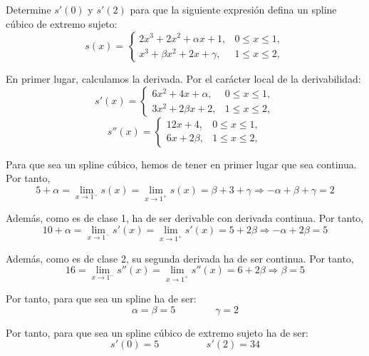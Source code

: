 \documentclass[12pt]{article}
\begin{document}
    \begin{ejercicio} 
    Determine $s'(0)$ y $s'(2)$ para que la siguiente expresión defina un spline cúbico de extremo sujeto:
    \begin{equation*}
        s(x)=\left\{\begin{array}{cc}
             2x^3 + 2x^2 +\alpha x +1, & 0\leq x \leq 1,  \\
             x^3+\beta x^2 + 2x + \gamma, & 1\leq x \leq 2,
        \end{array}\right.
    \end{equation*}

    En primer lugar, calculamos la derivada. Por el carácter local de la derivabilidad:
    \begin{equation*}
        s'(x)=\left\{\begin{array}{cc}
             6x^2 + 4x + \alpha , & 0\leq x \leq 1,  \\
             3x^2+2\beta x + 2, & 1\leq x \leq 2,
        \end{array}\right.
    \end{equation*}
    \begin{equation*}
        s''(x)=\left\{\begin{array}{cc}
             12x +4, & 0\leq x \leq 1,  \\
             6x+2\beta, & 1\leq x \leq 2,
        \end{array}\right.
    \end{equation*}

    Para que sea un spline cúbico, hemos de tener en primer lugar que sea continua. Por tanto,
    \begin{equation*}
        5+\alpha = \lim_{x\to 1^-}s(x) = \lim_{x\to 1^+}s(x) = \beta + 3 + \gamma \Longrightarrow -\alpha + \beta + \gamma = 2
    \end{equation*}

    Además, como es de clase 1, ha de ser derivable con derivada continua. Por tanto,
    \begin{equation*}
        10+\alpha = \lim_{x\to 1^-}s'(x) = \lim_{x\to 1^+}s'(x) = 5 + 2\beta
        \Longrightarrow -\alpha + 2\beta = 5
    \end{equation*}

    Además, como es de clase 2, su segunda derivada ha de ser continua. Por tanto,
    \begin{equation*}
        16 = \lim_{x\to 1^-}s''(x) = \lim_{x\to 1^+}s''(x) = 6 + 2\beta
        \Longrightarrow \beta = 5
    \end{equation*}

    Por tanto, para que sea un spline ha de ser:
    \begin{equation*}
        \alpha = \beta = 5 \qquad \qquad \gamma = 2
    \end{equation*}

    Por tanto, para que sea un spline cúbico de extremo sujeto ha de ser:
    \begin{equation*}
        s'(0)=5  \hspace{2cm} s'(2) = 34
    \end{equation*}
\end{ejercicio}
\end{document}
